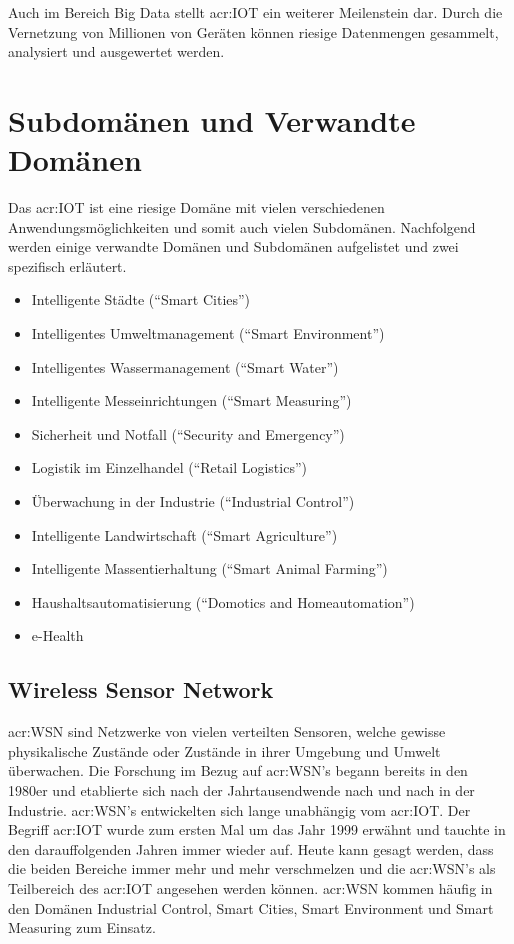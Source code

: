 Auch im Bereich Big Data stellt \gls{acr:IOT} ein weiterer Meilenstein dar. Durch die Vernetzung von Millionen von Geräten können riesige Datenmengen gesammelt, analysiert und ausgewertet werden.


\section{Subdomänen und Verwandte Domänen}
Das \gls{acr:IOT} ist eine riesige Domäne mit vielen verschiedenen Anwendungsmöglichkeiten und somit auch vielen Subdomänen. Nachfolgend werden einige verwandte Domänen und Subdomänen aufgelistet und zwei spezifisch erläutert.

\begin{itemize}
\item Intelligente Städte ("`Smart Cities"')
\item Intelligentes Umweltmanagement ("`Smart Environment"')
\item Intelligentes Wassermanagement ("`Smart Water"')
\item Intelligente Messeinrichtungen ("`Smart Measuring"')
\item Sicherheit und Notfall ("`Security and Emergency"')
\item Logistik im Einzelhandel ("`Retail Logistics"')
\item Überwachung in der Industrie ("`Industrial Control"')
\item Intelligente Landwirtschaft ("`Smart Agriculture"')
\item Intelligente Massentierhaltung ("`Smart Animal Farming"')
\item Haushaltsautomatisierung ("`Domotics and Homeautomation"')
\item e-Health
\end{itemize}


\subsection{Wireless Sensor Network}
\gls{acr:WSN} sind Netzwerke von vielen verteilten Sensoren, welche gewisse physikalische Zustände oder Zustände in ihrer Umgebung und Umwelt überwachen. Die Forschung im Bezug auf \gls{acr:WSN}'s begann bereits in den 1980er und etablierte sich nach der Jahrtausendwende nach und nach in der Industrie. \gls{acr:WSN}'s entwickelten sich lange unabhängig vom \gls{acr:IOT}. Der Begriff \gls{acr:IOT} wurde zum ersten Mal um das Jahr 1999 erwähnt und tauchte in den darauffolgenden Jahren immer wieder auf. Heute kann gesagt werden, dass die beiden Bereiche immer mehr und mehr verschmelzen und die \gls{acr:WSN}'s als Teilbereich des \gls{acr:IOT} angesehen werden können. \gls{acr:WSN} kommen häufig in den Domänen Industrial Control, Smart Cities, Smart Environment und Smart Measuring zum Einsatz.


